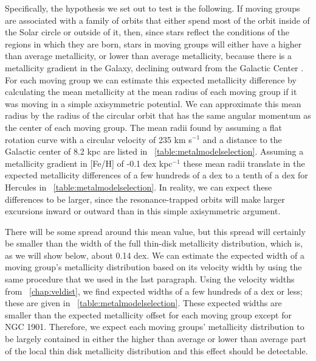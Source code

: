 Specifically, the hypothesis we set out to test is the following. If
moving groups are associated with a family of orbits that either spend
most of the orbit inside of the Solar circle or outside of it, then,
since stars reflect the conditions of the regions in which they are
born, stars in moving groups will either have a higher than average
metallicity, or lower than average metallicity, because there is a
metallicity gradient in the Galaxy, declining outward from the
Galactic Center
\citep[\eg,][]{Shaver83a,Afflerbach97a,2004A&A...418..989N,Rudolph06a}. For
each moving group we can estimate this expected metallicity difference
by calculating the mean metallicity at the mean radius of each moving
group if it was moving in a simple axisymmetric potential. We can
approximate this mean radius by the radius of the circular orbit that
has the same angular momentum as the center of each moving group. The
mean radii found by assuming a flat rotation curve with a circular
velocity of 235 km s$^{-1}$ and a distance to the Galactic center of
8.2 kpc \citep{BovyXD} are listed in
\tablename~\ref{table:metalmodelselection}. Assuming a metallicity
gradient in [Fe/H] of -0.1 dex kpc$^{-1}$
\citep[\eg,][]{Mayor76a,2004A&A...418..989N} these mean radii translate in
the expected metallicity differences of a few hundreds of a dex to a
tenth of a dex for Hercules in
\tablename~\ref{table:metalmodelselection}. In reality, we can expect
these differences to be larger, since the resonance-trapped orbits
will make larger excursions inward or outward than in this simple
axisymmetric argument.

There will be some spread around this mean value, but this spread will
certainly be smaller than the width of the full thin-disk metallicity
distribution, which is, as we will show below, about 0.14 dex. We can
estimate the expected width of a moving group's metallicity
distribution based on its velocity width by using the same procedure
that we used in the last paragraph. Using the velocity widths from
\chaptername~\ref{chap:veldist}, we find expected widths of a few hundreds of a dex or less;
these are given in \tablename~\ref{table:metalmodelselection}. These
expected widths are smaller than the expected metallicity offset for
each moving group except for NGC 1901. Therefore, we expect each
moving groups' metallicity distribution to be largely contained in
either the higher than average or lower than average part of the local
thin disk metallicity distribution and this effect should be
detectable.

